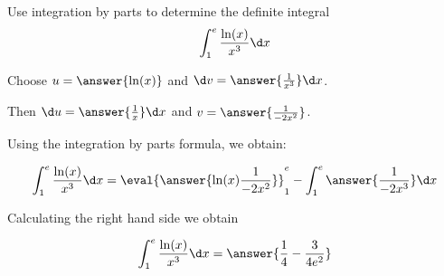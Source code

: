 \documentclass{ximera}
\author{Jason Miller}
\begin{document}
\begin{exercise}
Use integration by parts to determine the definite integral
\[
\int_{1}^{e} \frac{ \ln(x)}{x^{3}} \d x
\]


Choose $u=\answer{ \ln(x) }$ and $\d v=\answer{\frac{1}{x^{3}}}\d x$. 

Then $\d u= \answer{ \frac{1}{x} } \d x$ and $v= \answer{\frac{1}{-2x^{2}}}$.

Using the integration by parts formula, we obtain:

\[
\int_{1}^{e} \frac{ \ln(x)}{x^{3}} \d x= \eval{\answer{  \ln(x) \frac{1}{-2x^{2}}}}_1^e - \int_{1}^{e} \answer{ \frac{1}{-2x^{3}}}  \d x
\]

Calculating the right hand side we obtain

\[
\int_{1}^{e} \frac{ \ln(x)}{x^{3}} \d x= \answer{\frac{1}{4} - \frac{3}{4e^{2}} }
\]


\end{exercise}
\end{document}
